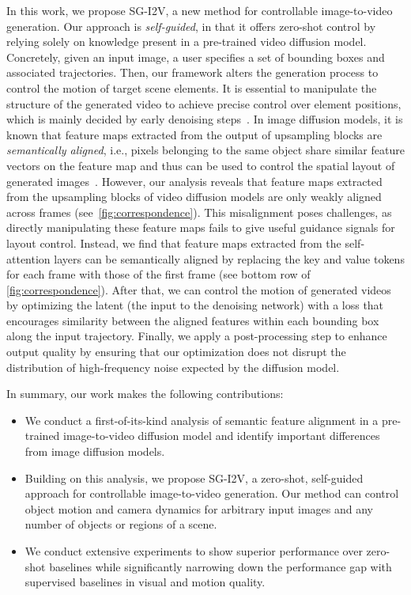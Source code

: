 In this work, we propose SG-I2V, a new method for controllable image-to-video generation.
Our approach is \textit{self-guided}, in that it offers zero-shot control by relying solely on knowledge present in a pre-trained video diffusion model. 
Concretely, given an input image, a user specifies a set of bounding boxes and associated trajectories.
Then, our framework alters the generation process to control the motion of target scene elements.
It is essential to manipulate the structure of the
generated video to achieve precise control over element positions, which is mainly decided by early denoising steps~\citep{balaji2022ediff,DMProcessAnalyze}.
In image diffusion models, it is known that feature maps extracted from the output of upsampling blocks are \textit{semantically aligned}, i.e., pixels belonging to the same object share similar feature vectors on the feature map and thus can be used to control the spatial layout of generated images~\citep{tang2023emergent, shi2024dragdiffusion, namekata2024emerdiff, tumanyan2023plug}.
However, our analysis reveals that feature maps extracted from the upsampling blocks of video diffusion models are only weakly aligned across frames (see~\cref{fig:correspondence}).
This misalignment poses challenges, as directly manipulating these feature maps fails to give useful guidance signals for layout control. %
Instead, we find that feature maps extracted from the self-attention layers can be semantically aligned by replacing the key and value tokens for each frame with those of the first frame (see bottom row of \cref{fig:correspondence}).
After that, we can control the motion of generated videos by optimizing the latent (the input to the denoising network) with a loss that encourages similarity between the aligned features within each bounding box along the input trajectory. 
Finally, we apply a post-processing step to enhance output quality by ensuring that our optimization does not disrupt the distribution of high-frequency noise expected by the diffusion model.




In summary, our work makes the following contributions:
\begin{itemize}
    \item We conduct a first-of-its-kind analysis of semantic feature alignment in a pre-trained image-to-video diffusion model and identify important differences from image diffusion models.
    \item Building on this analysis, we propose SG-I2V, a zero-shot, self-guided approach for controllable image-to-video generation.
    Our method can control object motion and camera dynamics for arbitrary input images and any number of objects or regions of a scene.
    \item We conduct extensive experiments to show superior performance over zero-shot baselines while significantly narrowing down the performance gap with supervised baselines in visual and motion quality.
\end{itemize}








